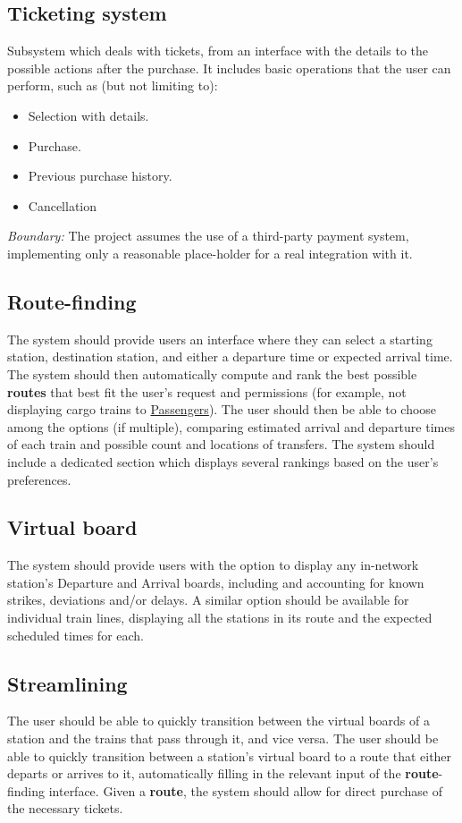 \documentclass[12pt]{article}
\renewcommand\bf[1]{\textbf{#1}}
\renewcommand\it[1]{\textit{#1}}
\newcommand\un[1]{\underline{#1}}
\begin{document}
\subsection{Ticketing system} \label{O.2}
Subsystem which deals with tickets, from an interface with the details to the possible actions after the purchase. It includes basic operations that the user can perform, such as (but not limiting to):
\begin{itemize}
	\item Selection with details.
	\item Purchase.
	\item Previous purchase history.
	\item Cancellation
\end{itemize}

\it{Boundary:} The project assumes the use of a third-party payment system, implementing only a reasonable place-holder for a real integration with it.

\subsection{Route-finding} \label{O.3}
The system should provide users an interface where they can select a starting station, destination station, and either a departure time or expected arrival time.
The system should then automatically compute and rank the best possible \bf{routes} that best fit the user's request and permissions
(for example, not displaying cargo trains to \un{Passengers}).
The user should then be able to choose among the options (if multiple), comparing estimated arrival and departure times of each train and possible count and locations of transfers.
The system should include a dedicated section which displays several rankings based on the user's preferences.

\subsection{Virtual board} \label{O.4}
The system should provide users with the option to display any in-network station's Departure and Arrival boards, including and accounting for known strikes, deviations and/or delays. 
A similar option should be available for individual train lines, displaying all the stations in its route and the expected scheduled times for each.

\subsection{Streamlining} \label{O.5}
The user should be able to quickly transition between the virtual boards of a station and the trains that pass through it, and vice versa.
The user should be able to quickly transition between a station's virtual board to a route that either departs or arrives to it,
automatically filling in the relevant input of the \bf{route}-finding interface.
Given a \bf{route}, the system should allow for direct purchase of the necessary tickets.
\end{document}
